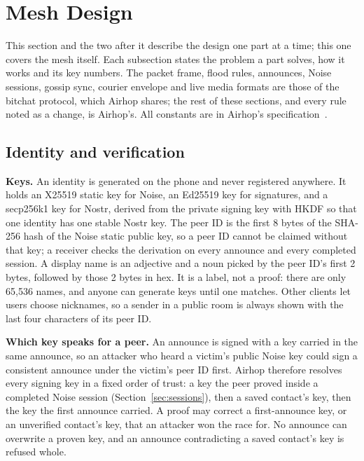 \documentclass[conference]{IEEEtran}
\begin{document}
\section{Mesh Design}
\label{sec:design}

This section and the two after it describe the design one part at a time; this one covers the mesh itself. Each subsection states the problem a part solves, how it works and its key numbers. The packet frame, flood rules, announces, Noise sessions, gossip sync, courier envelope and live media formats are those of the bitchat protocol, which Airhop shares; the rest of these sections, and every rule noted as a change, is Airhop's. All constants are in Airhop's specification~\cite{airhopspec}.

\subsection{Identity and verification}
\label{sec:identity}

\textbf{Keys.} An identity is generated on the phone and never registered anywhere. It holds an X25519 static key for Noise, an Ed25519 key for signatures, and a secp256k1 key for Nostr, derived from the private signing key with HKDF so that one identity has one stable Nostr key. The peer ID is the first 8 bytes of the SHA-256 hash of the Noise static public key, so a peer ID cannot be claimed without that key; a receiver checks the derivation on every announce and every completed session. A display name is an adjective and a noun picked by the peer ID's first 2 bytes, followed by those 2 bytes in hex. It is a label, not a proof: there are only 65,536 names, and anyone can generate keys until one matches. Other clients let users choose nicknames, so a sender in a public room is always shown with the last four characters of its peer ID.

\textbf{Which key speaks for a peer.} An announce is signed with a key carried in the same announce, so an attacker who heard a victim's public Noise key could sign a consistent announce under the victim's peer ID first. Airhop therefore resolves every signing key in a fixed order of trust: a key the peer proved inside a completed Noise session (Section~\ref{sec:sessions}), then a saved contact's key, then the key the first announce carried. A proof may correct a first-announce key, or an unverified contact's key, that an attacker won the race for. No announce can overwrite a proven key, and an announce contradicting a saved contact's key is refused whole.
\end{document}
